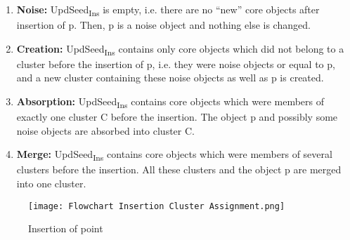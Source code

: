 \documentclass[acmsmall]{acmart}
\begin{document}
\begin{enumerate}
\begin{itemize}
        \begin{enumerate}
            \item \textbf{Noise: }
            {UpdSeed\textsubscript{Ins}} is empty, i.e. there are no “new” core objects after insertion of p. Then, p is a noise object and nothing else is changed.
            \item \textbf{Creation: } {UpdSeed\textsubscript{Ins}} contains only core objects which did not belong to a cluster before the insertion of p, i.e. they were noise objects or equal to p, and a new cluster containing these noise objects as well as p is created.
            \item \textbf{Absorption: } {UpdSeed\textsubscript{Ins}} contains core objects which were members of exactly one cluster C before the insertion. The object p and possibly some noise objects are absorbed into cluster C.
            \item \textbf{Merge: } {UpdSeed\textsubscript{Ins}} contains core objects which were members of several clusters before the insertion. All these clusters and the object p are merged into one cluster. \\
        \end{enumerate}
        
        \begin{figure}[!h]
            \centering
            \texttt{[image: Flowchart Insertion Cluster Assignment.png]}
            \caption{Insertion of point}
            \label{fig:my_label}
        \end{figure}
        

\end{itemize}
\end{enumerate}
\end{document}
